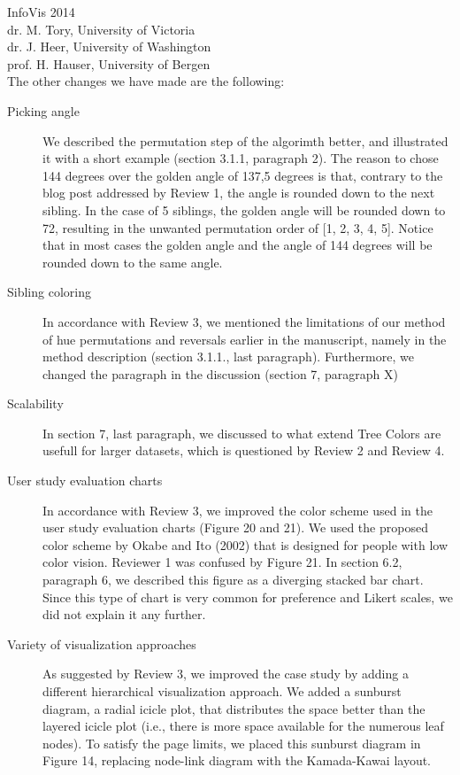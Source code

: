 \documentclass{letter}
\begin{document}
\begin{letter}{InfoVis 2014 \\ dr. M. Tory, University of Victoria \\ dr. J. Heer, University of Washington \\ prof. H. Hauser, University of Bergen}
\newpage
{} \\

The other changes we have made are the following:

\begin{description}
\item[Picking angle] We described the permutation step of the algorimth better, and illustrated it with a short example (section 3.1.1, paragraph 2). The reason to chose 144 degrees over the golden angle of 137,5 degrees is that, contrary to the blog post addressed by Review 1, the angle is rounded down to the next sibling. In the case of 5 siblings, the golden angle will be rounded down to 72, resulting in the unwanted permutation order of [1, 2, 3, 4, 5]. Notice that in most cases the golden angle and the angle of 144 degrees will be rounded down to the same angle.
\item[Sibling coloring] In accordance with Review 3, we mentioned the limitations of our method of hue permutations and reversals earlier in the manuscript, namely in the method description (section 3.1.1., last paragraph). Furthermore, we changed the paragraph in the discussion (section 7, paragraph X)
\item[Scalability] In section 7, last paragraph, we discussed to what extend Tree Colors are usefull for larger datasets, which is questioned by Review 2 and Review 4.
\item[User study evaluation charts] In accordance with Review 3, we improved the color scheme used in the user study evaluation charts (Figure 20 and 21). We used the proposed color scheme by Okabe and Ito (2002) that is designed for people with low color vision. Reviewer 1 was confused by Figure 21. In section 6.2, paragraph 6, we described this figure as a diverging stacked bar chart. Since this type of chart is very common for preference and Likert scales, we did not explain it any further.
\item[Variety of visualization approaches] As suggested by Review 3, we improved the case study by adding a different hierarchical visualization approach. We added a sunburst diagram, a radial icicle plot, that distributes the space better than the layered icicle plot (i.e., there is more space available for the numerous leaf nodes). To satisfy the page limits, we placed this sunburst diagram in Figure 14, replacing node-link diagram with the Kamada-Kawai layout.
\end{description}


\end{letter}
\end{document}
